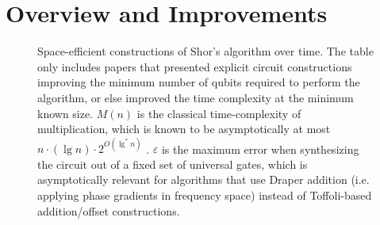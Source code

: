 \documentclass[twocolumn,longbibliography]{quantumarticle-customized}
\begin{document}
\section{Overview and Improvements} \label{sec:costs}

\begin{figure}
  \centering
  \caption{
    Space-efficient constructions of Shor's algorithm over time.
    The table only includes papers that presented explicit circuit constructions improving the minimum number of qubits required to perform the algorithm, or else improved the time complexity at the minimum known size.
    $M(n)$ is the classical time-complexity of multiplication, which is known to be asymptotically at most $n \cdot (\lg n) \cdot 2^{O(\lg^* n)}$ \cite{furer2007}.
    $\varepsilon$ is the maximum error when synthesizing the circuit out of a fixed set of universal gates, which is asymptotically relevant for algorithms that use Draper addition \cite{draper2000} (i.e. applying phase gradients in frequency space) instead of Toffoli-based addition/offset constructions.
  }
  \label{fig:table-over-time}
\end{figure}
\end{document}

